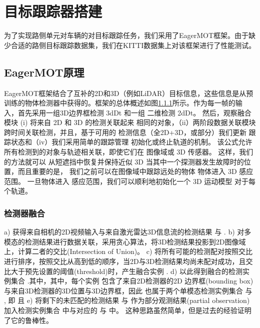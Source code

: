 \newpage
{}
\section{目标跟踪器搭建}

为了实现路侧单元对车辆的对目标跟踪任务，我们采用了EagerMOT框架。由于缺少合适的路侧目标跟踪数据集，我们在KITTI数据集上对该框架进行了性能测试。

\subsection{EagerMOT原理}

EagerMOT框架结合了互补的2D和3D（例如LiDAR）目标信息，这些信息是从预训练的物体检测器中获得的。框架的总体概述如图\ref{}所示。作为每一帧的输入，首先采用一组3D边界框检测 3dDt 和一组
二维检测 2dDt。 然后，观察融合模块
(i) 将来自 2D 和 3D 的检测关联起来
相同的对象，（ii）两阶段数据关联模块
跨时间关联检测，并且，基于可用的
检测信息（全2D+3D，或部分）我们更新
跟踪状态和（iv）我们采用简单的跟踪管理
初始化或终止轨道的机制。
该公式允许所有检测到的对象与轨迹相关联，即使它们在
图像域或 3D 传感器。 这样，我们的方法就可以
从短遮挡中恢复并保持近似 3D
当其中一个探测器发生故障时的位置，而且重要的是，
我们之前可以在图像域中跟踪远处的物体
物体进入 3D 感应范围。 一旦物体进入
感应范围，我们可以顺利地初始化一个 3D 运动模型
对于每个轨道。

\subsubsection{检测器融合}

a) 获得来自相机的2D视频输入与来自激光雷达3D信息流的检测结果 与 .
b) 对多模态的检测结果进行数据关联，采用贪心算法，将3D检测结果投影到2D图像域上，计算二者的交比(Intersection of Union)。
c) 将所有可能的检测配对按照交比进行排序，按照交比从高到低的顺序，当2D与3D检测结果均尚未配对成功，且交比大于预先设置的阈值(threshold)时，产生融合实例 .
d) 以此得到融合的检测实例集合 .其中，其中，每个实例 包含了来自2D检测器的2D 边界框(bounding box)与来自3D检测器的3D位置与3D边界框，因此 也属于两个单模态检测实例集合 与 , 即 且 
e) 将剩下的未匹配的检测结果 与 作为部分观测结果(partial observation)加入检测实例集合 中与对应的 与 中。
这种思路虽然简单，但是过去的经验证明了它的鲁棒性。
